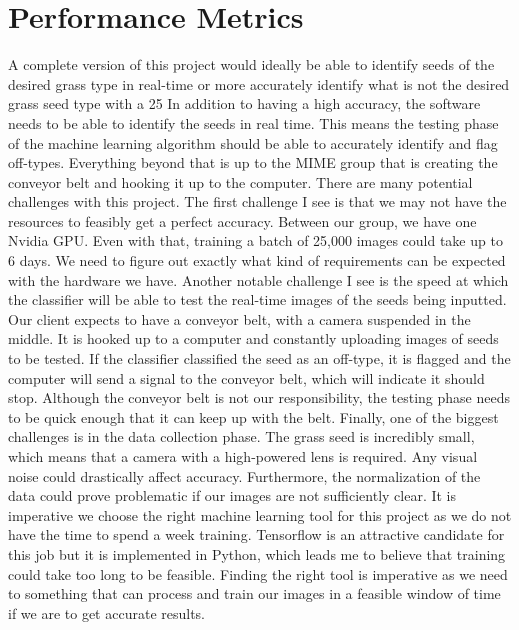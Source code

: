 \documentclass[onecolumn, draftclsnofoot,10pt, compsoc]{IEEEtran}
\begin{document}
\section{Performance Metrics}
A complete version of this project would ideally be able to identify seeds of the desired grass type in real-time or more accurately identify what is not the desired grass seed type with a 25%
In addition to having a high accuracy, the software needs to be able to identify the seeds in real time. This means the testing phase of the machine learning algorithm should be able to accurately identify and flag off-types. Everything beyond that is up to the MIME group that is creating the conveyor belt and hooking it up to the computer. 
There are many potential challenges with this project. The first challenge I see is that we may not have the resources to feasibly get a perfect accuracy. Between our group, we have one Nvidia GPU. Even with that, training a batch of 25,000 images could take up to 6 days. We need to figure out exactly what kind of requirements can be expected with the hardware we have. 
Another notable challenge I see is the speed at which the classifier will be able to test the real-time images of the seeds being inputted. Our client expects to have a conveyor belt, with a camera suspended in the middle. It is hooked up to a computer and constantly uploading images of seeds to be tested. If the classifier classified the seed as an off-type, it is flagged and the computer will send a signal to the conveyor belt, which will indicate it should stop. Although the conveyor belt is not our responsibility, the testing phase needs to be quick enough that it can keep up with the belt.  
Finally, one of the biggest challenges is in the data collection phase. The grass seed is incredibly small, which means that a camera with a high-powered lens is required. Any visual noise could drastically affect accuracy. Furthermore, the normalization of the data could prove problematic if our images are not sufficiently clear. It is imperative we choose the right machine learning tool for this project as we do not have the time to spend a week training. Tensorflow is an attractive candidate for this job but it is implemented in Python, which leads me to believe that training could take too long to be feasible. Finding the right tool is imperative as we need to something that can process and train our images in a feasible window of time if we are to get accurate results.
\end{document}
